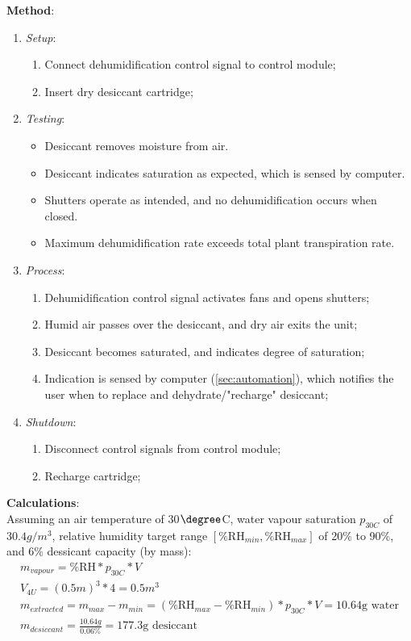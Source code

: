 \textbf{Method}:
\begin{enumerate}
    \item \textit{Setup}:
    \begin{enumerate}
        \item Connect dehumidification control signal to control module;
        \item Insert dry desiccant cartridge;
    \end{enumerate}
    \item \textit{Testing}:
    \begin{itemize}
        \item Desiccant removes moisture from air.
        \item Desiccant indicates saturation as expected, which is sensed by computer.
        \item Shutters operate as intended, and no dehumidification occurs when closed.
        \item Maximum dehumidification rate exceeds total plant transpiration rate.
    \end{itemize}
    \item \textit{Process}:
    \begin{enumerate}
        \item Dehumidification control signal activates fans and opens shutters;
        \item Humid air passes over the desiccant, and dry air exits the unit;
        \item Desiccant becomes saturated, and indicates degree of saturation;
        \item Indication is sensed by computer (\ref{sec:automation}), which notifies the user when to replace and dehydrate/"recharge" desiccant;
    \end{enumerate}
    \item \textit{Shutdown}:
    \begin{enumerate}
        \item Disconnect control signals from control module;
        \item Recharge cartridge;
    \end{enumerate}
\end{enumerate}

\textbf{Calculations}:\\
Assuming an air temperature of 30$\degree$C, water vapour saturation $p_{30C}$ of $30.4g/m^{3}$, relative humidity target range $[\text{\%RH}_{min},\text{\%RH}_{max}]$ of 20\% to 90\%, and 6\% dessicant capacity (by mass):
\begin{gather}
    m_{vapour} = \text{\%RH} * p_{30C} * V\\
    V_{4U} = (0.5m)^3 * 4 = 0.5m^{3} \\
    m_{extracted} = m_{max} - m_{min} = (\text{\%RH}_{max}-\text{\%RH}_{min}) * p_{30C} * V = 10.64\text{g water}\\
    m_{desiccant}=\frac{10.64g}{0.06 \%} = 177.3\text{g desiccant}
\end{gather}

